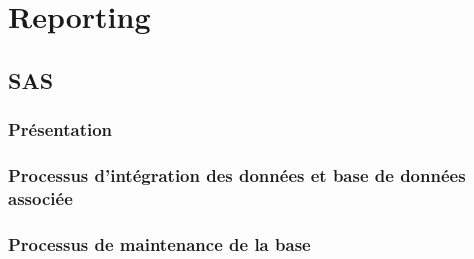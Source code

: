 
\chapter{Reporting}
\section{SAS}
\subsection{Présentation}

\subsection{Processus d'intégration des données et base de données associée}

\subsection{Processus de maintenance de la base}

\clearpage
